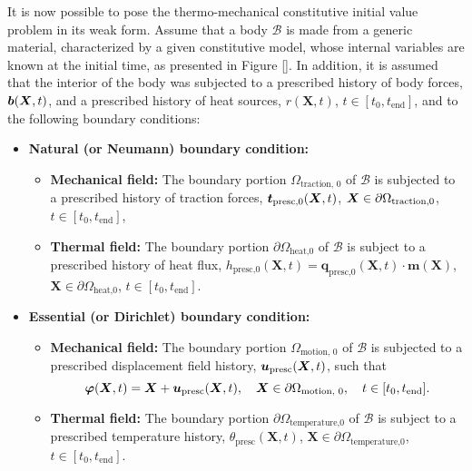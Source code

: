 It is now possible to pose the thermo-mechanical constitutive initial value problem in its weak form.
Assume that a body $\mathscr{B}$ is made from a generic material, characterized by a given constitutive model, whose internal variables are known at the initial time, as presented in Figure \ref{}.
In addition, it is assumed that the interior of the body was subjected to a prescribed history of body forces, $\bm{b}(\bm X, t)$, and a prescribed history of heat sources, $r(\bm X,t)$, $t\in[t_0, t_\text{end}]$, and to the following boundary conditions:
\begin{itemize}
    \item \textbf{Natural (or Neumann) boundary condition:}
    \begin{itemize}
      \item \textbf{Mechanical field:} The boundary portion $\Omega_\text{traction, 0}$ of $\mathscr{B}$ is subjected to a prescribed history of traction forces, $\bm{t}_\text{presc,0}(\bm{X}, t)$, $\bm{X}\in \partial \Omega_\text{traction,0}$, $t\in[t_0, t_\text{end}]$,\\
      \item \textbf{Thermal field:} The boundary portion \(\partial \Omega_\text{heat,0}\) of \(\mathcal B\) is subject to a prescribed history of heat flux, \(h_\text{presc,0}(\bm X, t) = \bm q_\text{presc,0}(\bm X, t)\cdot \bm m(\bm X)\), \(\bm X \in \partial \Omega_\text{heat,0}\), \(t\in [t_0,t_\text{end}]\).
    \end{itemize}
    \item \textbf{Essential (or Dirichlet) boundary condition:}
    \begin{itemize}
      \item \textbf{Mechanical field:} The boundary portion $\Omega_\text{motion, 0}$ of $\mathscr{B}$ is subjected to a prescribed displacement field history, $\bm{u}_\text{presc}(\bm{X}, t)$, such that $$\bm{\varphi}(\bm{X}, t) = \bm{X} + \bm{u}_\text{presc}(\bm{X}, t),\quad \bm{X}\in \partial\Omega_\text{motion, 0},\quad t\in[t_0, t_\text{end}].$$
      \item \textbf{Thermal field:} The boundary portion \(\partial \Omega_\text{temperature,0}\) of \(\mathcal B\) is subject to a prescribed temperature history, \(\theta_\text{presc}(\bm X, t)\), \(\bm X \in \partial \Omega_\text{temperature,0}\), \(t\in [t_0,t_\text{end}]\).
    \end{itemize}
\end{itemize}

